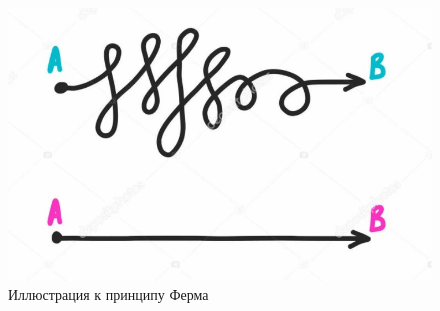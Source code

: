 \begin{figure} 
\vspace{-2ex}
\includegraphics[width=1.1\linewidth]{pictures/5.1.jpg}
\caption{Иллюстрация к принципу Ферма}
\end{figure}

